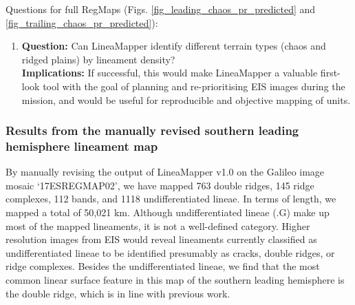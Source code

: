 Questions for full RegMaps (Figs. \ref{fig_leading_chaos_pr_predicted} and \ref{fig_trailing_chaos_pr_predicted}):
\begin{enumerate}
    \item \textbf{Question:} Can LineaMapper identify different terrain types (chaos and ridged plains) by lineament density?\\
    \textbf{Implications:} If successful, this would make LineaMapper a valuable first-look tool with the goal of planning and re-prioritising EIS images during the mission, and would be useful for reproducible and objective mapping of units.
\end{enumerate}


\subsubsection{Results from the manually revised southern leading hemisphere lineament map}\label{sec:ALL_map_results}
By manually revising the output of LineaMapper v1.0 on the Galileo image mosaic `17ESREGMAP02', we have mapped 763 double ridges, 145 ridge complexes, 112 bands, and 1118 undifferentiated lineae. In terms of length, we mapped a total of 50,021 km. Although undifferentiated lineae (.G) make up most of the mapped lineaments, it is not a well-defined category. Higher resolution images from EIS would reveal lineaments currently classified as undifferentiated lineae to be identified presumably as cracks, double ridges, or ridge complexes. Besides the undifferentiated lineae, we find that the most common linear surface feature in this map of the southern leading hemisphere is the double ridge, which is in line with previous work. 


